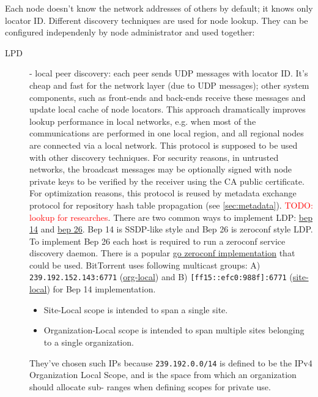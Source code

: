 \documentclass[acmlarge, screen, nonacm]{acmart}
\newcommand{\code}[1]{\texttt{#1}}
\newcommand{\todo}[1]{\textcolor{red}{TODO: #1}}
\begin{document}
Each node doesn't know the network addresses of others by default; it knows only locator ID.
Different discovery techniques are used for node lookup. They can be configured independenly by node
administrator and used together:

\begin{description}
  \item[LPD] - local peer discovery: each peer sends UDP messages with locator ID.
    It's cheap and fast for the network layer (due to UDP messages); other system components,
    such as front-ends and back-ends receive these messages and update local cache of node locators.
    This approach dramatically improves lookup performance in local networks, e.g. when most of the communications
    are performed in one local region, and all regional nodes are connected via a local network.
    This protocol is supposed to be used with other discovery techniques.
    For security reasons, in untrusted networks, the broadcast messages may be optionally signed with
    node private keys to be verified by the receiver using the CA public certificate.
    For optimization reasons, this protocol is reused by metadata exchange protocol for
    repository hash table propagation (see \ref{sec:metadata}). \todo{lookup for researches}.
    There are two common ways to implement LDP: \href{http://bittorrent.org/beps/bep_0014.html}{bep 14} and \href{http://bittorrent.org/beps/bep_0026.html}{bep 26}.
    Bep 14 is SSDP-like style and Bep 26 is zeroconf style LDP. To implement Bep 26 each host is required to run a zeroconf service discovery daemon.
    There is a popular \href{https://github.com/grandcat/zeroconf}{go zeroconf implementation} that could be used.
    BitTorrent uses following multicast groups: A) \code{239.192.152.143:6771} (\href{https://tools.ietf.org/html/rfc2365#section-6.2}{org-local}) and B) \code{[ff15::efc0:988f]:6771} (\href{https://tools.ietf.org/html/rfc4291#section-2.5.7}{site-local}) for Bep 14 implementation.
    \begin{itemize}
      \item Site-Local scope is intended to span a single site.
      \item Organization-Local scope is intended to span multiple sites
      belonging to a single organization.
    \end{itemize}
    They've chosen such IPs because \code{239.192.0.0/14} is defined to be the IPv4 Organization Local Scope,
    and is the space from which an organization should allocate sub-
    ranges when defining scopes for private use.

\end{description}
\end{document}
